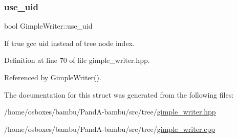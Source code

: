 \subsubsection{\texorpdfstring{use\+\_\+uid}{use\_uid}}
{\footnotesize\ttfamily bool Gimple\+Writer\+::use\+\_\+uid\hspace{0.3cm}{\ttfamily [private]}}



If true gcc uid instead of tree node index. 



Definition at line 70 of file gimple\+\_\+writer.\+hpp.



Referenced by Gimple\+Writer().



The documentation for this struct was generated from the following files\+:\begin{DoxyCompactItemize}
\item 
/home/osboxes/bambu/\+Pand\+A-\/bambu/src/tree/\hyperlink{gimple__writer_8hpp}{gimple\+\_\+writer.\+hpp}\item 
/home/osboxes/bambu/\+Pand\+A-\/bambu/src/tree/\hyperlink{gimple__writer_8cpp}{gimple\+\_\+writer.\+cpp}\end{DoxyCompactItemize}
